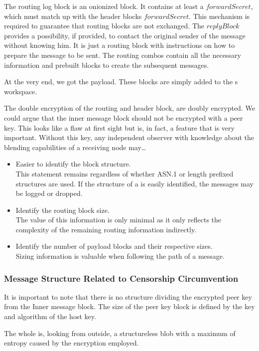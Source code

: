 The routing log block is an onionized block. It contains at least a $forwardSecret$, which must match up with the header blocks $forwardSecret$. This mechanism is required to guarantee that routing blocks are not exchanged. The $replyBlock$ provides a possibility, if provided, to contact the original sender of the message without knowing him. It is just a routing block with instructions on how to prepare the message to be sent. The routing combos contain all the necessary information and prebuilt blocks to create the subsequent messages.

At the very end, we got the payload. These blocks are simply added to the s workspace.

The double encryption of the routing and header block, are doubly encrypted. We could argue that the inner message block should not be encrypted with a peer key. This looks like a flaw at first sight but is, in fact, a feature that is very important. Without this key, any independent observer with knowledge about the blending capabilities of a receiving node may\ldots
\begin{itemize}
	\item Easier to identify the block structure.\\ 
	This statement remains regardless of whether ASN.1 or length prefixed structures are used. If the structure of a \VortexMessage is easily identified, the messages may be logged or dropped.
	\item Identify the routing block size.\\
	The value of this information is only minimal as it only reflects the complexity of the remaining routing information indirectly.
	\item Identify the number of payload blocks and their respective sizes. \\
	Sizing information is valuable when following the path of a message.
\end{itemize}

\subsubsection{Message Structure Related to Censorship Circumvention}
It is important to note that there is no structure dividing the encrypted peer key from the Inner message block. The size of the peer key block is defined by the key and algorithm of the host key. 

The whole \VortexMessage is, looking from outside, a structureless blob with a maximum of entropy caused by the encryption employed. 

